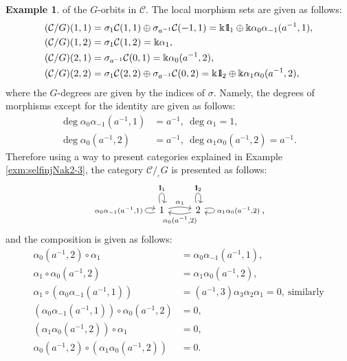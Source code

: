 \documentclass{surv-l}
\numberwithin{equation}{chapter}
\numberwithin{figure}{chapter}
\theoremstyle{plain}
\theoremstyle{definition}
\newtheorem{exm}[thm]{Example}
\theoremstyle{remark}
\newcommand{\id}{1\kern-.25em{\text{{\rm l}}}}
\newcommand{\corbit}{/\!_{_{\mathrm{c}}}}
\newcommand{\Ar}[3]{\ar[from={#1}, to={#2}, #3]}
\begin{document}
\begin{exm}
of the $G$-orbits in ${\mathcal{C}}$.
The local morphism sets are given as follows:
\[
\begin{aligned}
({\mathcal{C}}/G)(1,1) &= \sigma_1{\mathcal{C}}(1,1) \oplus \sigma_{a^{-1}}{\mathcal{C}}(-1,1)
= \Bbbk\id_1 \oplus \Bbbk \alpha_0 \alpha_{-1} (a^{-1}, 1),\\
({\mathcal{C}}/G)(1,2) &= \sigma_1{\mathcal{C}}(1,2) = \Bbbk \alpha_1,\\
({\mathcal{C}}/G)(2,1) &= \sigma_{a^{-1}}{\mathcal{C}}(0,1) = \Bbbk \alpha_0(a^{-1}, 2),\\
({\mathcal{C}}/G)(2,2) &= \sigma_1{\mathcal{C}}(2,2) \oplus \sigma_{a^{-1}}{\mathcal{C}}(0,2)
= \Bbbk\id_2 \oplus \Bbbk \alpha_1 \alpha_0(a^{-1}, 2),
\end{aligned}
\]
where the $G$-degrees are given by the indices of $\sigma$.
Namely, the degrees of morphisms except for the identity
are given as follows:
\begin{equation}\label{eq:Hom-degree}
\begin{aligned}
\deg \alpha_0 \alpha_{-1} (a^{-1}, 1) &= a^{-1},\ \deg \alpha_1 = 1, \\
\deg \alpha_0(a^{-1}, 2) &= a^{-1},\ \deg \alpha_1 \alpha_0(a^{-1}, 2) = a^{-1}.
\end{aligned}
\end{equation}
Therefore using a way to present categories explained in Example \ref{exm:selfinjNak2-3},
the category ${\mathcal{C}}\corbit G$ is presented as follows:
\[
\begin{tikzcd}
\ar[loop above, "\id_1"]\ar[loop left, "{\alpha_0 \alpha_{-1}(a^{-1}, 1)}"]
1 & 2
\ar[loop right, "{\alpha_1 \alpha_0(a^{-1}, 2)}"] \ar[loop above, "\id_2"]
\Ar{1-1}{1-2}{"\alpha_1", bend left=15}
\Ar{1-2}{1-1}{"{\alpha_0(a^{-1}, 2)}", bend left=15}
\end{tikzcd},
\]
and the composition is given as follows:
\[
\begin{aligned}
\alpha_0 (a^{-1}, 2)\circ \alpha_1 &= \alpha_0 \alpha_{-1}(a^{-1}, 1),\\
\alpha_1 \circ \alpha_0 (a^{-1}, 2)&= \alpha_1 \alpha_0 (a^{-1}, 2),\\
\alpha_1 \circ (\alpha_0 \alpha_{-1}(a^{-1}, 1)) &= (a^{-1}, 3)\alpha_3 \alpha_2 \alpha_1 = 0,\ \text{similarly}\\
(\alpha_0 \alpha_{-1}(a^{-1}, 1)) \circ \alpha_0 (a^{-1}, 2)&=  0,\\
(\alpha_1 \alpha_0(a^{-1}, 2)) \circ \alpha_1 &= 0,\\
\alpha_0 (a^{-1}, 2)\circ (\alpha_1 \alpha_0(a^{-1}, 2)) &= 0.

\end{aligned}\]
\end{exm}
\end{document}
